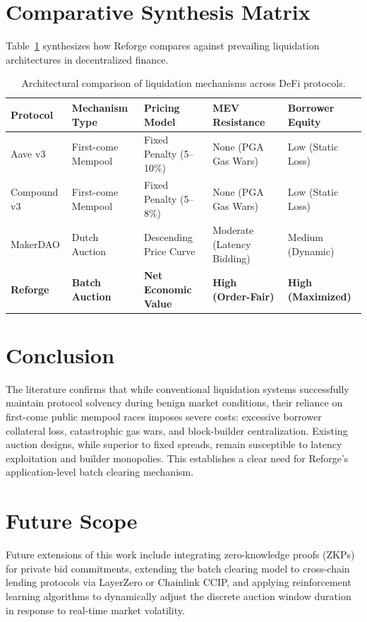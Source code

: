 \section{Comparative Synthesis Matrix}
Table~\ref{tab:lit_comparison} synthesizes how Reforge compares against prevailing liquidation architectures in decentralized finance.

\begin{table}[htbp]
\centering
\small
\caption{Architectural comparison of liquidation mechanisms across DeFi protocols.}
\label{tab:lit_comparison}
\begin{tabular}{p{2.2cm}|p{3.0cm}|p{3.0cm}|p{3.2cm}|p{2.2cm}}
\hline
\textbf{Protocol} & \textbf{Mechanism Type} & \textbf{Pricing Model} & \textbf{MEV Resistance} & \textbf{Borrower Equity} \\
\hline
Aave v3 & First-come Mempool & Fixed Penalty (5--10\%) & None (PGA Gas Wars) & Low (Static Loss) \\
Compound v3 & First-come Mempool & Fixed Penalty (5--8\%) & None (PGA Gas Wars) & Low (Static Loss) \\
MakerDAO & Dutch Auction & Descending Price Curve & Moderate (Latency Bidding) & Medium (Dynamic) \\
\textbf{Reforge} & \textbf{Batch Auction} & \textbf{Net Economic Value} & \textbf{High (Order-Fair)} & \textbf{High (Maximized)} \\
\hline
\end{tabular}
\end{table}

\section{Conclusion}
The literature confirms that while conventional liquidation systems successfully maintain protocol solvency during benign market conditions, their reliance on first-come public mempool races imposes severe costs: excessive borrower collateral loss, catastrophic gas wars, and block-builder centralization. Existing auction designs, while superior to fixed spreads, remain susceptible to latency exploitation and builder monopolies. This establishes a clear need for Reforge's application-level batch clearing mechanism.

\section{Future Scope}
Future extensions of this work include integrating zero-knowledge proofs (ZKPs) for private bid commitments, extending the batch clearing model to cross-chain lending protocols via LayerZero or Chainlink CCIP, and applying reinforcement learning algorithms to dynamically adjust the discrete auction window duration in response to real-time market volatility.
